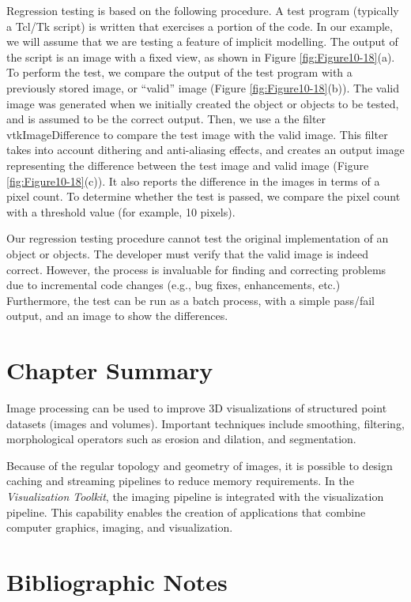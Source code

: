 Regression testing is based on the following procedure. A test program (typically a Tcl/Tk script) is written that exercises a portion of the code. In our example, we will assume that we are testing a feature of implicit modelling. The output of the script is an image with a fixed view, as shown in Figure \ref{fig:Figure10-18}(a). To perform the test, we compare the output of the test program with a previously stored image, or ``valid'' image (Figure \ref{fig:Figure10-18}(b)). The valid image was generated when we initially created the object or objects to be tested, and is assumed to be the correct output. Then, we use a the filter vtkImageDifference to compare the test image with the valid image. This filter takes into account dithering and anti-aliasing effects, and creates an output image representing the difference between the test image and valid image (Figure \ref{fig:Figure10-18}(c)). It also reports the difference in the images in terms of a pixel count. To determine whether the test is passed, we compare the pixel count with a threshold value (for example, 10 pixels).

Our regression testing procedure cannot test the original implementation of an object or objects. The developer must verify that the valid image is indeed correct. However, the process is invaluable for finding and correcting problems due to incremental code changes (e.g., bug fixes, enhancements, etc.) Furthermore, the test can be run as a batch process, with a simple pass/fail output, and an image to show the differences.

\section{Chapter Summary}

Image processing can be used to improve 3D visualizations of structured point datasets (images and volumes). Important techniques include smoothing, filtering, morphological operators such as erosion and dilation, and segmentation.

Because of the regular topology and geometry of images, it is possible to design caching and streaming pipelines to reduce memory requirements. In the \emph{Visualization Toolkit}, the imaging pipeline is integrated with the visualization pipeline. This capability enables the creation of applications that combine computer graphics, imaging, and visualization.

\section{Bibliographic Notes}


